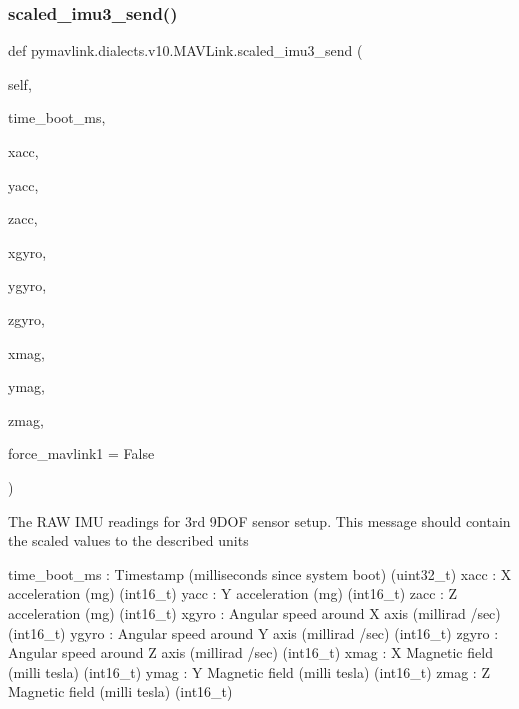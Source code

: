 \begin{DoxyVerb}
\begin{DoxyVerb}
\begin{DoxyVerb}
\begin{DoxyVerb}
\begin{DoxyVerb}
\begin{DoxyVerb}
\begin{DoxyVerb}
\begin{DoxyVerb}
\begin{DoxyVerb}
\begin{DoxyVerb}
\subsubsection{\texorpdfstring{scaled\+\_\+imu3\+\_\+send()}{scaled\_imu3\_send()}}
{\footnotesize\ttfamily def pymavlink.\+dialects.\+v10.\+M\+A\+V\+Link.\+scaled\+\_\+imu3\+\_\+send (\begin{DoxyParamCaption}\item[{}]{self,  }\item[{}]{time\+\_\+boot\+\_\+ms,  }\item[{}]{xacc,  }\item[{}]{yacc,  }\item[{}]{zacc,  }\item[{}]{xgyro,  }\item[{}]{ygyro,  }\item[{}]{zgyro,  }\item[{}]{xmag,  }\item[{}]{ymag,  }\item[{}]{zmag,  }\item[{}]{force\+\_\+mavlink1 = {\ttfamily False} }\end{DoxyParamCaption})}

\begin{DoxyVerb}The RAW IMU readings for 3rd 9DOF sensor setup. This message should
contain the scaled values to the described units

time_boot_ms              : Timestamp (milliseconds since system boot) (uint32_t)
xacc                      : X acceleration (mg) (int16_t)
yacc                      : Y acceleration (mg) (int16_t)
zacc                      : Z acceleration (mg) (int16_t)
xgyro                     : Angular speed around X axis (millirad /sec) (int16_t)
ygyro                     : Angular speed around Y axis (millirad /sec) (int16_t)
zgyro                     : Angular speed around Z axis (millirad /sec) (int16_t)
xmag                      : X Magnetic field (milli tesla) (int16_t)
ymag                      : Y Magnetic field (milli tesla) (int16_t)
zmag                      : Z Magnetic field (milli tesla) (int16_t)\end{DoxyVerb}
 \mbox{\label{classpymavlink_1_1dialects_1_1v10_1_1MAVLink_a09724d5e708e45a67bd07253f898839f}} 

\end{DoxyVerb}
\end{DoxyVerb}
\end{DoxyVerb}
\end{DoxyVerb}
\end{DoxyVerb}
\end{DoxyVerb}
\end{DoxyVerb}
\end{DoxyVerb}
\end{DoxyVerb}
\end{DoxyVerb}
